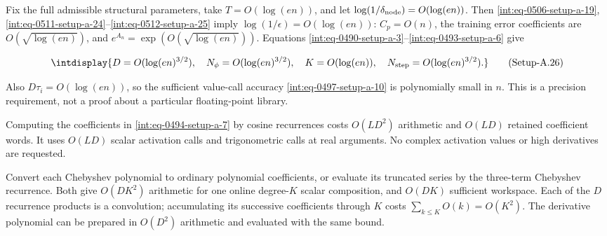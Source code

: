 
Fix the full admissible structural parameters, take \(T=O(\log(en))\), and let \(\log(1/\delta_{\rm node})=O(\log(en))\). Then \hyperref[int:eq-setup-a-19]{\eqref{int:eq-0506-setup-a-19}}, \hyperref[int:eq-setup-a-24]{\eqref{int:eq-0511-setup-a-24}}--\allowbreak \hyperref[int:eq-setup-a-25]{\eqref{int:eq-0512-setup-a-25}} imply \(\log(1/\epsilon)=O(\log(en))\): \(C_p=O(n)\), the training error coefficients are \(O(\sqrt{\log(en)})\), and \(e^{A_n}=\exp(O(\sqrt{\log(en)}))\). Equations \hyperref[int:eq-setup-a-3]{\eqref{int:eq-0490-setup-a-3}}--\allowbreak \hyperref[int:eq-setup-a-6]{\eqref{int:eq-0493-setup-a-6}} give


\label{int:eq-setup-a-26}
\begingroup\renewcommand{\theHequation}{intdisplay.993}
\begin{equation}
\intdisplay{
D=O(\log(en)^{3/2}),\quad N_\phi=O(\log(en)^{3/2}),\quad
K=O(\log(en)),\quad N_{\rm step}=O(\log(en)^{3/2}).
}
\tag{Setup-A.26}
\label{int:eq-0513-setup-a-26}
\end{equation}
\endgroup


Also \(D\tau_i=O(\log(en))\), so the sufficient value-call accuracy \hyperref[int:eq-setup-a-10]{\eqref{int:eq-0497-setup-a-10}} is polynomially small in \(n\). This is a precision requirement, not a proof about a particular floating-point library.



Computing the coefficients in \hyperref[int:eq-setup-a-7]{\eqref{int:eq-0494-setup-a-7}} by cosine recurrences costs \(O(LD^2)\) arithmetic and \(O(LD)\) retained coefficient words. It uses \(O(LD)\) scalar activation calls and trigonometric calls at real arguments. No complex activation values or high derivatives are requested.



Convert each Chebyshev polynomial to ordinary polynomial coefficients, or evaluate its truncated series by the three-term Chebyshev recurrence. Both give \(O(DK^2)\) arithmetic for one online degree-\(K\) scalar composition, and \(O(DK)\) sufficient workspace. Each of the \(D\) recurrence products is a convolution; accumulating its successive coefficients through \(K\) costs \(\sum_{k\le K}O(k)=O(K^2)\). The derivative polynomial can be prepared in \(O(D^2)\) arithmetic and evaluated with the same bound.



